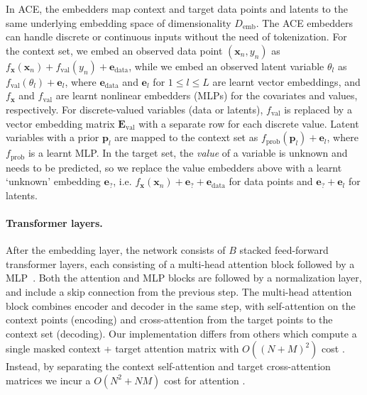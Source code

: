 \documentclass[twoside]{article}
\newcommand{\e}{\mathbf{e}}
\newcommand{\E}{\mathbf{E}}
\newcommand{\x}{\mathbf{x}}
\begin{document}
In ACE, the embedders map context and target data points and latents to the same underlying embedding space of dimensionality $D_\text{emb}$. The ACE embedders can handle discrete or continuous inputs without the need of tokenization.
For the context set, we embed an observed data point $(\x_n, y_n)$ as $f_\x(\x_n) + f_\text{val}(y_n) + \e_\text{data}$, while we embed an observed latent variable $\theta_l$ as $f_\text{val}(\theta_l) + \e_l$, where $\e_\text{data}$ and $\e_l$ for $1\le l \le L$ are learnt vector embeddings, and $f_\x$ and $f_\text{val}$ are learnt nonlinear embedders (MLPs) for the covariates and values, respectively.
For discrete-valued variables (data or latents), $f_\text{val}$ is replaced by a vector embedding matrix $\E_\text{val}$ with a separate row for each discrete value.
Latent variables with a prior $\mathbf{p}_l$ are mapped to the context set as $f_\text{prob}(\mathbf{p}_l) + \e_l$, where $f_\text{prob}$ is a learnt MLP.
In the target set, the \emph{value} of a variable is unknown and needs to be predicted, so we replace the value embedders above with a learnt `unknown' embedding $\e_?$, i.e. $f_\x(\x_n) + \e_? + \e_\text{data}$ for data points and $\e_? + \e_l$ for latents.


\vspace{-0.25em}
\paragraph{Transformer layers.}

After the embedding layer, the network consists of $B$ stacked feed-forward transformer layers, each consisting of a multi-head attention block followed by a MLP~\citep{vaswani2017attention}. Both the attention and MLP blocks are followed by a normalization layer, and include a skip connection from the previous step. The multi-head attention block combines encoder and decoder in the same step, with self-attention on the context points (encoding) and cross-attention from the target points to the context set (decoding). Our implementation differs from others which compute a single masked context + target attention matrix with $O((N + M)^2)$ cost \citep{nguyen2022transformer,muller2022transformers}. Instead, by separating the context self-attention and target cross-attention matrices we incur a $O(N^2 + NM)$ cost for attention \citep{feng2023latent}.


\vspace{-0.25em}
\end{document}
